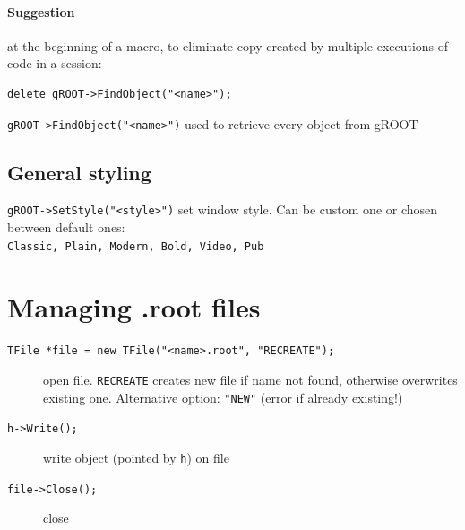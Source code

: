 \documentclass[10pt, oneside]{article}
\begin{document}
\paragraph{Suggestion} at the beginning of a macro, to eliminate copy created by multiple executions of code in a session:
\begin{verbatim}
delete gROOT->FindObject("<name>");
\end{verbatim}
\texttt{gROOT->FindObject("<name>")} used to retrieve every object from gROOT
\subsection*{General styling}
\texttt{gROOT->SetStyle("<style>")} set window style. Can be custom one or chosen between default ones:\\
\texttt{Classic, Plain, Modern, Bold, Video, Pub}

\section{Managing .root files}
\begin{description}
\item[\texttt{TFile *file = new TFile("<name>.root", "RECREATE");}] open file. \texttt{RECREATE} creates new file if name not found, otherwise overwrites existing one. Alternative option: \texttt{"NEW"} (error if already existing!)
\item[\texttt{h->Write();}] write object (pointed by \texttt{h}) on file
\item[\texttt{file->Close();}] close
\end{description}
\end{document}
